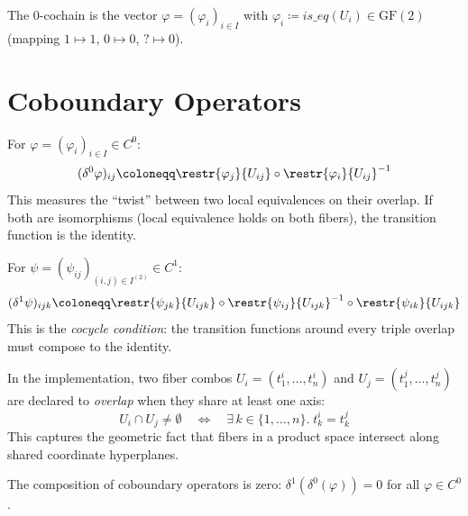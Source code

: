 \begin{remark}
The 0-cochain is the vector
$\varphi = (\varphi_i)_{i \in I}$ with
$\varphi_i \coloneqq \mathit{is\_eq}(U_i) \in \mathrm{GF}(2)$
(mapping $1 \mapsto 1$, $0 \mapsto 0$, ${?} \mapsto 0$).
\end{remark}

\section{Coboundary Operators}

\begin{definition}
\label{def:delta0}
For $\varphi = (\varphi_i)_{i \in I} \in C^0$:
\[
  (\delta^0 \varphi)_{ij} \coloneqq \restr{\varphi_j}{U_{ij}} \circ
    \restr{\varphi_i}{U_{ij}}^{-1}
\]
This measures the ``twist'' between two local equivalences on their
overlap.  If both are isomorphisms (local equivalence holds on both
fibers), the transition function is the identity.
\end{definition}

\begin{definition}
\label{def:delta1}
For $\psi = (\psi_{ij})_{(i,j) \in I^{(2)}} \in C^1$:
\[
  (\delta^1 \psi)_{ijk} \coloneqq \restr{\psi_{jk}}{U_{ijk}} \circ
    \restr{\psi_{ij}}{U_{ijk}}^{-1} \circ \restr{\psi_{ik}}{U_{ijk}}
\]
This is the \emph{cocycle condition}: the transition functions around
every triple overlap must compose to the identity.
\end{definition}

\begin{definition}
\label{def:overlap-impl}
In the implementation, two fiber combos $U_i = (t_1^i, \ldots, t_n^i)$
and $U_j = (t_1^j, \ldots, t_n^j)$ are declared to \emph{overlap}
when they share at least one axis:
\[
  U_i \cap U_j \neq \emptyset
  \quad\Longleftrightarrow\quad
  \exists\, k \in \{1, \ldots, n\}.\;
    t_k^i = t_k^j
\]
This captures the geometric fact that fibers in a product space
intersect along shared coordinate hyperplanes.
\end{definition}

\begin{lemma}[$\delta^1 \circ \delta^0 = 0$]
\label{lem:d1d0}
The composition of coboundary operators is zero:
$\delta^1(\delta^0(\varphi)) = 0$ for all $\varphi \in C^0$.
\end{lemma}

